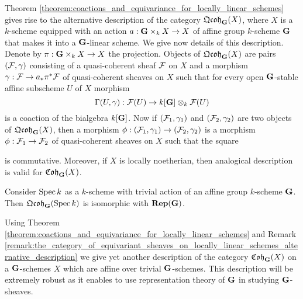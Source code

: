 \begin{remark}\label{remark:the_category_of_equivariant_sheaves_on_locally_linear_schemes_alternative_description}
Theorem \ref{theorem:coactions_and_equivariance_for_locally_linear_schemes} gives rise to the alternative description of the category $\mathfrak{Qcoh}_{\mathbf{G}}(X)$, where $X$ is a $k$-scheme equipped with an action $a:\mathbf{G}\times_kX\rightarrow X$ of affine group $k$-scheme $\mathbf{G}$ that makes it into a $\mathbf{G}$-linear scheme. We give now details of this description. Denote by $\pi:\mathbf{G}\times_kX\rightarrow X$ the projection. Objects of $\mathfrak{Qcoh}_{\mathbf{G}}(X)$ are pairs $({\mathcal F},\gamma)$ consisting of a quasi-coherent sheaf ${\mathcal F}$ on $X$ and a morphism $\gamma:{\mathcal F}\rightarrow a_*\pi^*{\mathcal F}$ of quasi-coherent sheaves on $X$ such that for every open $\mathbf{G}$-stable affine subscheme $U$ of $X$ morphism
$$\Gamma(U,\gamma):{\mathcal F}(U)\rightarrow k[\mathbf{G}]\otimes_k{\mathcal F}(U)$$
is a coaction of the bialgebra $k[\mathbf{G}]$. Now if $({\mathcal F}_1,\gamma_1)$ and $({\mathcal F}_2,\gamma_2)$ are two objects of $\mathfrak{Qcoh}_{\mathbf{G}}(X)$, then a morphism $\phi:({\mathcal F}_1,\gamma_1)\rightarrow ({\mathcal F}_2,\gamma_2)$ is a morphism $\phi:{\mathcal F}_1\rightarrow {\mathcal F}_2$ of quasi-coherent sheaves on $X$ such that the square
\begin{center}
\end{center}
is commutative. Moreover, if $X$ is locally noetherian, then analogical description is valid for $\mathfrak{Coh}_{\mathbf{G}}(X)$.
\end{remark}

\begin{example}\label{example:equivariant_objects_on_point}
Consider $\mathrm{Spec}\, k$ as a $k$-scheme with trivial action of an affine group $k$-scheme $\mathbf{G}$. Then $\mathfrak{Qcoh}_{\mathbf{G}}(\mathrm{Spec}\, k)$ is isomorphic with $\mathbf{Rep}(\mathbf{G})$.
\end{example}
\noindent
Using Theorem \ref{theorem:coactions_and_equivariance_for_locally_linear_schemes} and Remark \ref{remark:the_category_of_equivariant_sheaves_on_locally_linear_schemes_alternative_description} we give yet another description of the category $\mathfrak{Coh}_{\mathbf{G}}(X)$ on a $\mathbf{G}$-schemes $X$ which are affine over trivial $\mathbf{G}$-schemes. This description will be extremely robust as it enables to use representation theory of $\mathbf{G}$ in studying $\mathbf{G}$-sheaves. 

